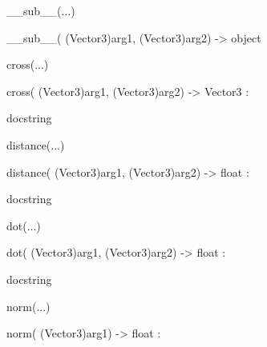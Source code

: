 \documentclass[letterpaper,10pt,english]{sphinxmanual}
\begin{document}
\begin{description}
\begin{description}
\begin{DUlineblock}{0em}
\item[] \_\_sub\_\_(...)
\item[]
\begin{DUlineblock}{\DUlineblockindent}
\item[] \_\_sub\_\_( (Vector3)arg1, (Vector3)arg2) -\textgreater{} object
\item[] 
\end{DUlineblock}
\item[] cross(...)
\item[]
\begin{DUlineblock}{\DUlineblockindent}
\item[] cross( (Vector3)arg1, (Vector3)arg2) -\textgreater{} Vector3 :
\item[]
\begin{DUlineblock}{\DUlineblockindent}
\item[] docstring
\item[] 
\end{DUlineblock}
\end{DUlineblock}
\item[] distance(...)
\item[]
\begin{DUlineblock}{\DUlineblockindent}
\item[] distance( (Vector3)arg1, (Vector3)arg2) -\textgreater{} float :
\item[]
\begin{DUlineblock}{\DUlineblockindent}
\item[] docstring
\item[] 
\end{DUlineblock}
\end{DUlineblock}
\item[] dot(...)
\item[]
\begin{DUlineblock}{\DUlineblockindent}
\item[] dot( (Vector3)arg1, (Vector3)arg2) -\textgreater{} float :
\item[]
\begin{DUlineblock}{\DUlineblockindent}
\item[] docstring
\item[] 
\end{DUlineblock}
\end{DUlineblock}
\item[] norm(...)
\item[]
\begin{DUlineblock}{\DUlineblockindent}
\item[] norm( (Vector3)arg1) -\textgreater{} float :

\end{DUlineblock}
\end{DUlineblock}
\end{description}
\end{description}
\end{document}
